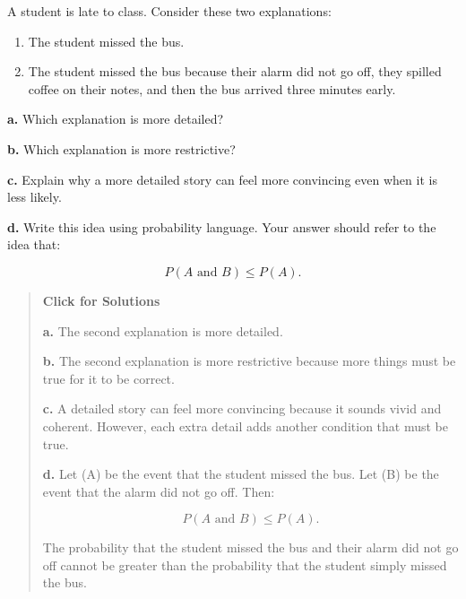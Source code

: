 \documentclass[
  letterpaper,
  DIV=11,
  numbers=noendperiod]{scrreprt}
\providecommand{\tightlist}{%
  \setlength{\itemsep}{0pt}\setlength{\parskip}{0pt}}
\begin{document}
\begin{tcolorbox}[enhanced jigsaw, arc=.35mm, bottomrule=.15mm, bottomtitle=1mm, breakable, colback=white, colbacktitle=quarto-callout-note-color!10!white, colframe=quarto-callout-note-color-frame, coltitle=black, left=2mm, leftrule=.75mm, opacityback=0, opacitybacktitle=0.6, rightrule=.15mm, title=\textcolor{quarto-callout-note-color}{\faInfo}\hspace{0.5em}{Question 14}, titlerule=0mm, toprule=.15mm, toptitle=1mm]

A student is late to class. Consider these two explanations:

\begin{enumerate}
\def\labelenumi{\arabic{enumi}.}
\tightlist
\item
  The student missed the bus.\\
\item
  The student missed the bus because their alarm did not go off, they
  spilled coffee on their notes, and then the bus arrived three minutes
  early.
\end{enumerate}

\textbf{a.} Which explanation is more detailed?

\textbf{b.} Which explanation is more restrictive?

\textbf{c.} Explain why a more detailed story can feel more convincing
even when it is less likely.

\textbf{d.} Write this idea using probability language. Your answer
should refer to the idea that:

\[P(A \text{ and } B) \leq P(A).\]

\begin{quote}
\textbf{Click for Solutions}

\textbf{a.} The second explanation is more detailed.

\textbf{b.} The second explanation is more restrictive because more
things must be true for it to be correct.

\textbf{c.} A detailed story can feel more convincing because it sounds
vivid and coherent. However, each extra detail adds another condition
that must be true.

\textbf{d.} Let (A) be the event that the student missed the bus. Let
(B) be the event that the alarm did not go off. Then:

\[P(A \text{ and } B) \leq P(A).\]

The probability that the student missed the bus and their alarm did not
go off cannot be greater than the probability that the student simply
missed the bus.
\end{quote}

\end{tcolorbox}
\end{document}
